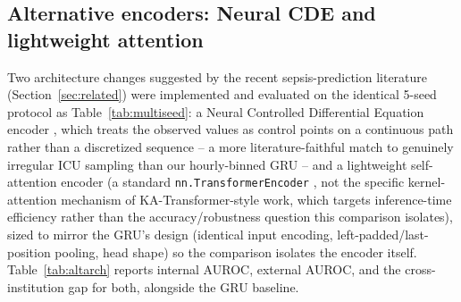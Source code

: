 \documentclass[11pt]{article}
\begin{document}
\subsection{Alternative encoders: Neural CDE and lightweight attention}
\label{sec:altarch}
Two architecture changes suggested by the recent sepsis-prediction literature (Section~\ref{sec:related}) were implemented and evaluated on the identical 5-seed protocol as Table~\ref{tab:multiseed}: a Neural Controlled Differential Equation encoder \citep{kidger2020neural}, which treats the observed values as control points on a continuous path rather than a discretized sequence -- a more literature-faithful match to genuinely irregular ICU sampling than our hourly-binned GRU -- and a lightweight self-attention encoder (a standard \texttt{nn.TransformerEncoder} \citep{vaswani2017attention}, not the specific kernel-attention mechanism of KA-Transformer-style work, which targets inference-time efficiency rather than the accuracy/robustness question this comparison isolates), sized to mirror the GRU's design (identical input encoding, left-padded/last-position pooling, head shape) so the comparison isolates the encoder itself. Table~\ref{tab:altarch} reports internal AUROC, external AUROC, and the cross-institution gap for both, alongside the GRU baseline.

\begin{table}[t]
\centering
\caption{Encoder comparison, 5-seed mean $\pm$ std.\ (gap std reported separately for readability). Neural CDE trades peak discrimination for a smaller, more consistent cross-institution gap; attention matches the GRU's discrimination at under half its parameter count but does not replicate the CDE's robustness gain.}
\label{tab:altarch}

\end{table}
\end{document}
